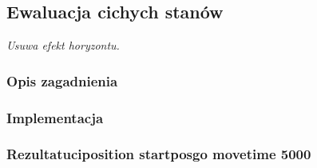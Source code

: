 \subsection{Ewaluacja cichych stanów}
\label{subsec:ewaluacja-cichych-stanow}
\textit{Usuwa efekt horyzontu.}


\subsubsection{Opis zagadnienia}

\subsubsection{Implementacja}
\subsubsection{Rezultatuciposition startposgo movetime 5000}